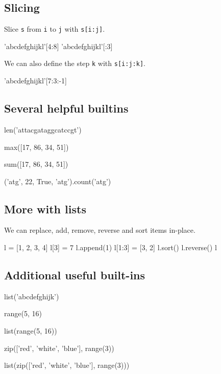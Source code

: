 \documentclass[aspectratio=1610,slidestop]{beamer}
\begin{document}
\subsection{Slicing}
\begin{pframe}
 Slice \texttt{s} from \texttt{i} to
 \texttt{j} with \texttt{s[i:j]}.
\begin{pyconsole}
'abcdefghijkl'[4:8]
'abcdefghijkl'[:3]
\end{pyconsole}
\medskip
\medskip
 We can also define the step \texttt{k} with
 \texttt{s[i:j:k]}.
\begin{pyconsole}
'abcdefghijkl'[7:3:-1]
\end{pyconsole}
\end{pframe}


\subsection{Several helpful builtins}
\begin{pframe}
\begin{pyconsole}
len('attacgataggcatccgt')

max([17, 86, 34, 51])

sum([17, 86, 34, 51])

('atg', 22, True, 'atg').count('atg')
\end{pyconsole}
\end{pframe}


\subsection{More with lists}
\begin{pframe}
 We can replace, add, remove, reverse and sort items in-place.
\begin{pyconsole}
l = [1, 2, 3, 4]
l[3] = 7
l.append(1)
l[1:3] = [3, 2]
l.sort()
l.reverse()
l
\end{pyconsole}
\end{pframe}


\subsection{Additional useful built-ins}
\begin{pframe}
\begin{pyconsole}
list('abcdefghijk')

range(5, 16)

list(range(5, 16))

zip(['red', 'white', 'blue'], range(3))

list(zip(['red', 'white', 'blue'], range(3)))
\end{pyconsole}
\end{pframe}
\end{document}
